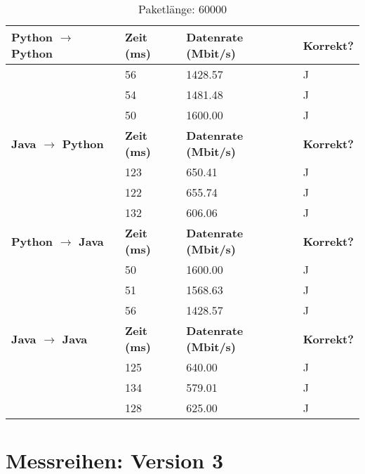 \documentclass{article}
\begin{document}
    \begin{table}[]
        \caption{Paketlänge: 60000}
        \label{tab:my-tablev2_60000}
        \begin{tabular}{|l|l|l|l|}
            \hline
            \textbf{Python $\rightarrow$ Python} & \textbf{Zeit (ms)} & \textbf{Datenrate (Mbit/s)} & \textbf{Korrekt?} \\ \hline
            & 56       & 1428.57         & J        \\ \cline{2-4}
            & 54       & 1481.48         & J        \\ \cline{2-4}
            & 50       & 1600.00         & J        \\ \hline
            \textbf{Java $\rightarrow$ Python}   & \textbf{Zeit (ms)} & \textbf{Datenrate (Mbit/s)} & \textbf{Korrekt?} \\ \hline
            & 123      & 650.41          & J        \\ \cline{2-4}
            & 122      & 655.74          & J        \\ \cline{2-4}
            & 132      & 606.06          & J        \\ \hline
            \textbf{Python $\rightarrow$ Java}  & \textbf{Zeit (ms)} & \textbf{Datenrate (Mbit/s)} & \textbf{Korrekt?} \\ \hline
            & 50       & 1600.00         & J        \\ \cline{2-4}
            & 51       & 1568.63         & J        \\ \cline{2-4}
            & 56       & 1428.57         & J        \\ \hline
            \textbf{Java $\rightarrow$ Java}   & \textbf{Zeit (ms)} & \textbf{Datenrate (Mbit/s)} & \textbf{Korrekt?} \\ \hline
            & 125      & 640.00          & J        \\ \cline{2-4}
            & 134      & 579.01          & J        \\ \cline{2-4}
            & 128      & 625.00          & J        \\ \hline
        \end{tabular}
    \end{table}

    \newpage

    \section{Messreihen: Version 3}\label{sec:messreihen:-version-3}
\end{document}
